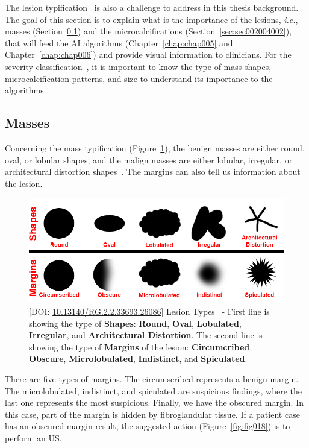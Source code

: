 The lesion typification~\cite{doi:10.1148/radiol.2018181371} is also a challenge to address in this thesis background.
The goal of this section is to explain what is the importance of the lesions, {\it i.e.}, masses (Section~\ref{sec:sec002004001}) and the microcalcifications (Section~\ref{sec:sec002004002}), that will feed the \ac{AI} algorithms (Chapter~\ref{chap:chap005} and Chapter~\ref{chap:chap006}) and provide visual information to clinicians.
For the severity classification~\cite{8611096, 9231684}, it is important to know the type of mass shapes, microcalcification patterns, and size to understand its importance to the algorithms.

\subsection{Masses}
\label{sec:sec002004001}

Concerning the mass typification (Figure~\ref{fig:fig021}), the benign masses are either round, oval, or lobular shapes, and the malign masses are either lobular, irregular, or architectural distortion shapes~\cite{nadia2020xai}.
The margins can also tell us information about the lesion.

\begin{figure}[htbp]
\centering
\includegraphics[width=\columnwidth]{images/fig021}
\caption{[DOI: \href{https://doi.org/10.13140/RG.2.2.33693.26086}{10.13140/RG.2.2.33693.26086}] Lesion Types~\cite{nadia2020maivelt} - First line is showing the type of {\bf Shapes}: {\bf Round}, {\bf Oval}, {\bf Lobulated}, {\bf Irregular}, and {\bf Architectural Distortion}. The second line is showing the type of {\bf Margins} of the lesion: {\bf Circumcribed}, {\bf Obscure}, {\bf Microlobulated}, {\bf Indistinct}, and {\bf Spiculated}.}
\label{fig:fig021}
\end{figure}

There are five types of margins.
The circumscribed represents a benign margin.
The microlobulated, indistinct, and spiculated are suspicious findings, where the last one represents the most suspicious.
Finally, we have the obscured margin.
In this case, part of the margin is hidden by fibroglandular tissue.
If a patient case has an obscured margin result, the suggested action (Figure~\ref{fig:fig018}) is to perform an \ac{US}.

